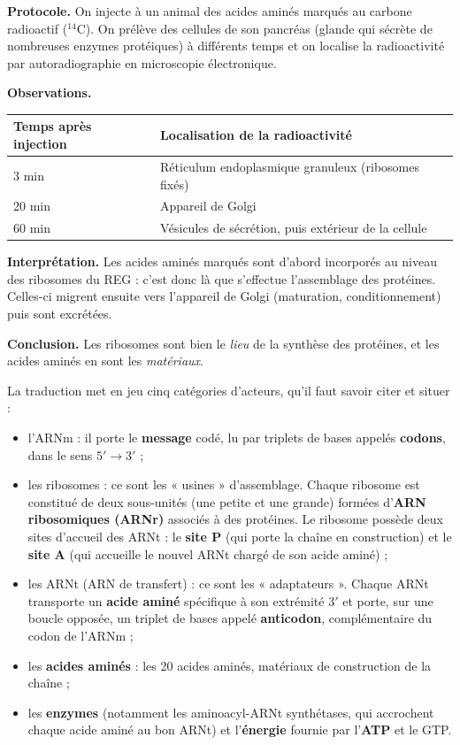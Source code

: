\documentclass[11pt]{article}
\newcommand{\cle}[1]{{\popxbold\color{popdark}#1}}
\newcounter{popsec}
\newcounter{popsub}
\newcommand{\courssub}[1]{%
  \stepcounter{popsub}%
  \par\vspace{9pt}\noindent{\popxbold\fontsize{11.5}{13}\selectfont\color{popink}{\color{poporange}\thepopsec.\thepopsub}\hspace{6pt}#1}\par\nopagebreak\vspace{4pt}
}
\begin{document}
\begin{experience}
\textbf{Protocole.} On injecte à un animal des acides aminés marqués au carbone radioactif ($^{14}$C). On prélève des cellules de son pancréas (glande qui sécrète de nombreuses enzymes protéiques) à différents temps et on localise la radioactivité par autoradiographie en microscopie électronique.

\textbf{Observations.}
\begin{center}
\begin{tabularx}{\linewidth}{|l|X|}\hline
\rowcolor{popblueL} \textbf{Temps après injection} & \textbf{Localisation de la radioactivité} \\ \hline
3 min & Réticulum endoplasmique granuleux (ribosomes fixés) \\ \hline
20 min & Appareil de Golgi \\ \hline
60 min & Vésicules de sécrétion, puis extérieur de la cellule \\ \hline
\end{tabularx}
\end{center}

\textbf{Interprétation.} Les acides aminés marqués sont d'abord incorporés au niveau des ribosomes du REG : c'est donc là que s'effectue l'assemblage des protéines. Celles-ci migrent ensuite vers l'appareil de Golgi (maturation, conditionnement) puis sont excrétées.

\textbf{Conclusion.} Les ribosomes sont bien le \emph{lieu} de la synthèse des protéines, et les acides aminés en sont les \emph{matériaux}.
\end{experience}

\courssub{Les acteurs de la traduction}

La traduction met en jeu cinq catégories d'acteurs, qu'il faut savoir citer et situer :

\begin{itemize}
\item l'\cle{ARNm} : il porte le \textbf{message} codé, lu par triplets de bases appelés \textbf{codons}, dans le sens $5' \rightarrow 3'$ ;
\item les \cle{ribosomes} : ce sont les « usines » d'assemblage. Chaque ribosome est constitué de deux sous-unités (une petite et une grande) formées d'\textbf{ARN ribosomiques (ARNr)} associés à des protéines. Le ribosome possède deux sites d'accueil des ARNt : le \textbf{site P} (qui porte la chaîne en construction) et le \textbf{site A} (qui accueille le nouvel ARNt chargé de son acide aminé) ;
\item les \cle{ARNt} (ARN de transfert) : ce sont les « adaptateurs ». Chaque ARNt transporte un \textbf{acide aminé} spécifique à son extrémité $3'$ et porte, sur une boucle opposée, un triplet de bases appelé \textbf{anticodon}, complémentaire du codon de l'ARNm ;
\item les \textbf{acides aminés} : les 20 acides aminés, matériaux de construction de la chaîne ;
\item les \textbf{enzymes} (notamment les aminoacyl-ARNt synthétases, qui accrochent chaque acide aminé au bon ARNt) et l'\textbf{énergie} fournie par l'\textbf{ATP} et le GTP.
\end{itemize}
\end{document}
